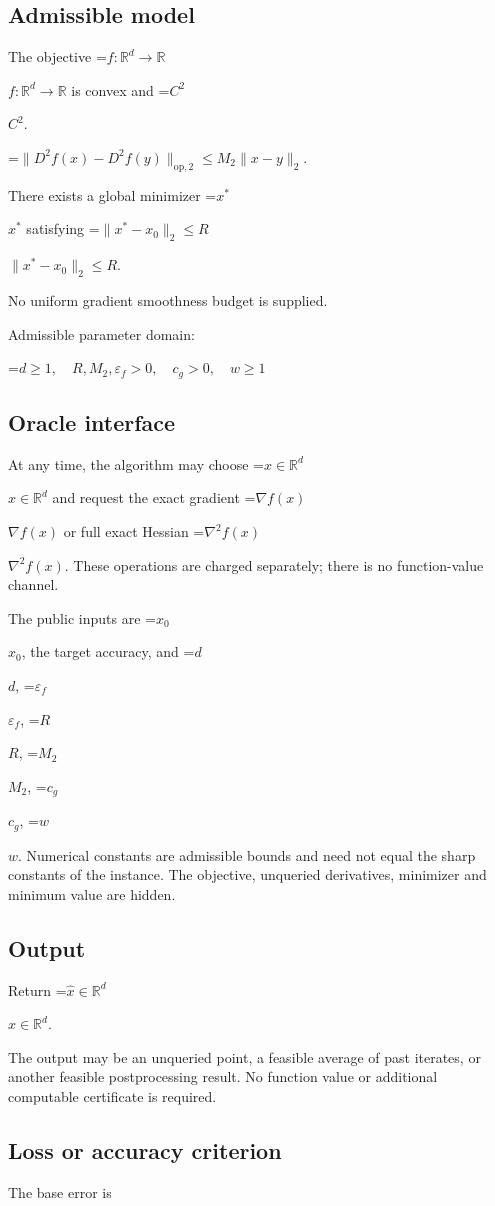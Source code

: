 \documentclass[10pt,a4paper]{article}
\newcommand{\AtlasMath}[1]{\par\begingroup\centering\setbox0=\hbox{$\displaystyle #1$}\ifdim\wd0>1.4\linewidth\typeout{ATLAS WIDE FORMULA: \the\wd0}\fi\ifdim\wd0>\linewidth\resizebox{\linewidth}{!}{\box0}\else\box0\fi\par\endgroup}
\newcommand{\AtlasInlineMath}[1]{\begingroup\setbox0=\hbox{$#1$}\ifdim\wd0>.4\linewidth\endgroup\AtlasMath{#1}\else\endgroup$#1$\fi}
\begin{document}
\subsection{Admissible model}
The objective \AtlasInlineMath{f:\mathbb{R}^d\to\mathbb{R}} is convex and \AtlasInlineMath{C^2}.


\AtlasMath{\|D^{2}f(x)-D^{2}f(y)\|_{\mathrm{op},2}\le M_2\|x-y\|_{2}.}


There exists a global minimizer \AtlasInlineMath{x^*} satisfying \AtlasInlineMath{\|x^*-x_0\|_2\le R}.

No uniform gradient smoothness budget is supplied.

Admissible parameter domain:


\AtlasMath{d\ge1,\quad R,M_2,\varepsilon_f>0,\quad c_g>0,\quad w\ge1}


\subsection{Oracle interface}
At any time, the algorithm may choose \AtlasInlineMath{x\in\mathbb{R}^d} and request the exact gradient \AtlasInlineMath{\nabla f(x)} or full exact Hessian \AtlasInlineMath{\nabla^2f(x)}. These operations are charged separately; there is no function-value channel.

The public inputs are \AtlasInlineMath{x_0}, the target accuracy, and \AtlasInlineMath{d}, \AtlasInlineMath{\varepsilon_f}, \AtlasInlineMath{R}, \AtlasInlineMath{M_2}, \AtlasInlineMath{c_g}, \AtlasInlineMath{w}. Numerical constants are admissible bounds and need not equal the sharp constants of the instance. The objective, unqueried derivatives, minimizer and minimum value are hidden.

\subsection{Output}
Return \AtlasInlineMath{\widehat{x}\in \mathbb{R}^d}.

The output may be an unqueried point, a feasible average of past iterates, or another feasible postprocessing result. No function value or additional computable certificate is required.

\subsection{Loss or accuracy criterion}
The base error is
\end{document}
